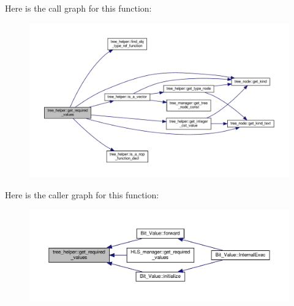 Here is the call graph for this function\+:
\nopagebreak
\begin{figure}[H]
\begin{center}
\leavevmode
\includegraphics[width=350pt]{d7/d99/classtree__helper_ac6e0286958beccf450e505d7c56fef6f_cgraph}
\end{center}
\end{figure}
Here is the caller graph for this function\+:
\nopagebreak
\begin{figure}[H]
\begin{center}
\leavevmode
\includegraphics[width=350pt]{d7/d99/classtree__helper_ac6e0286958beccf450e505d7c56fef6f_icgraph}
\end{center}
\end{figure}
\mbox{\label{classtree__helper_a4be4d473adb56f120981a29eda1bf3cc}} 

